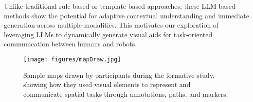 Unlike traditional rule-based or template-based approaches, these LLM-based methods show the potential for adaptive contextual understanding and immediate generation across multiple modalities. This motivates our exploration of leveraging LLMs to dynamically generate visual aids for task-oriented communication between humans and robots.







\begin{figure*}
  \centering
  \texttt{[image: figures/mapDraw.jpg]}
  \caption{Sample maps drawn by participants during the formative study, showing how they used visual elements to represent and communicate spatial tasks through annotations, paths, and markers.}
  \label{fig:paper map}
\end{figure*}